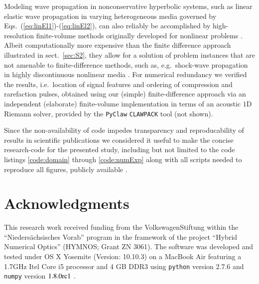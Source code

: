 \documentclass[5p,times,twocolumn]{elsarticle}
\begin{document}
Modeling wave propagation in nonconservative hyperbolic systems, such as
linear elastic wave propagation in varying heterogeneous media governed by
Eqs.\ (\ref{eq:linEl1})-(\ref{eq:linEl2}), can also reliably be accomplished by
high-resolution finite-volume methods originally developed for nonlinear
problems \cite{Fogarty:1999,LeVeque:1997}. Albeit computationally more
expensive than the finite difference approach illustrated in sect.\
\ref{sec:S2}, they allow for a solution of problem instances that are not
amenable to finite-difference methods, such as, e.g.\ shock-wave propagation in
highly discontinuous nonlinear media \cite{Berezovski:2006}. For numerical
redundancy we verified the results, i.e.\ location of signal features and
ordering of compression and rarefaction pulses, obtained using our (simple)
finite-difference approach via an independent (elaborate) finite-volume
implementation in terms of an acoustic $1$D Riemann solver, provided by the
{\tt{PyClaw}} {\tt{CLAWPACK}} tool
\cite{Ketcheson:2012,Clawpack:2017} (not shown).

Since the non-availability of code impedes transparency and reproducability of
results in scientific publications \cite{Barnes:2010,Ince:2012,Sandve:2013} we
considered it useful to make the concise research-code for the presented study,
including but not limited to the code listings \ref{code:domain} through
\ref{code:numExp} along with all scripts needed to reproduce all figures,
publicly available \cite{Melchert_gitHub_1DFD:2017}.

\section*{Acknowledgments}
This research work received funding from the VolkswagenStiftung within the
``Nieders\"achsisches Vorab'' program in the framework of the project ``Hybrid
Numerical Optics''  (HYMNOS; Grant ZN 3061). The software was developed and
tested under OS X Yosemite (Version: 10.10.3) on a MacBook Air featuring a
1.7GHz Itel Core i5 processor and 4 GB DDR3 using {\tt{python}}
\cite{Oliphant:2007} version $2.7.6$ and {\tt{numpy}} version $1.8.0{\rm{rc}}1$
\cite{Jones:2001}. 


\end{document}
